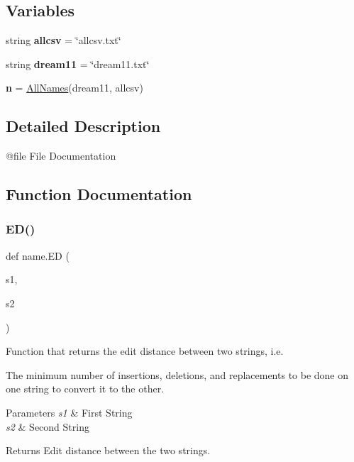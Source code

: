 \subsection*{Variables}
\begin{DoxyCompactItemize}
\item 
\mbox{\label{namespacename_a6a28b676bb9c9e9706d9aa25f4765617}} 
string {\bfseries allcsv} = \char`\"{}allcsv.\+txt\char`\"{}
\item 
\mbox{\label{namespacename_a7de18046eebfeb49a93d166a1032b812}} 
string {\bfseries dream11} = \char`\"{}dream11.\+txt\char`\"{}
\item 
\mbox{\label{namespacename_a9aee4a418049160854f32659ce451668}} 
{\bfseries n} = \hyperlink{classname_1_1AllNames}{All\+Names}(dream11, allcsv)
\end{DoxyCompactItemize}


\subsection{Detailed Description}
\begin{DoxyVerb}@file File Documentation
\end{DoxyVerb}
 

\subsection{Function Documentation}
\mbox{\label{namespacename_aaf6a02e97478e39abbec27e09d4d3fc7}} 
\subsubsection{\texorpdfstring{E\+D()}{ED()}}
{\footnotesize\ttfamily def name.\+ED (\begin{DoxyParamCaption}\item[{}]{s1,  }\item[{}]{s2 }\end{DoxyParamCaption})}



Function that returns the edit distance between two strings, i.\+e. 

The minimum number of insertions, deletions, and replacements to be done on one string to convert it to the other. 
\begin{DoxyParams}{Parameters}
{\em s1} & First String \\
\hline
{\em s2} & Second String \\
\hline
\end{DoxyParams}
\begin{DoxyReturn}{Returns}
Edit distance between the two strings. 
\end{DoxyReturn}
\mbox{\label{namespacename_aac6586237940f09049413cfc51952677}} 
